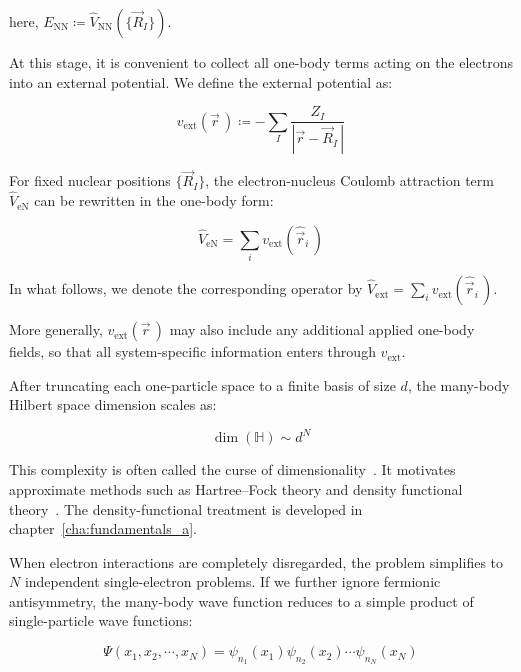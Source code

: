 here, $E_\mathrm{NN}\coloneqq \hat{V}_\mathrm{NN}(\{\vec{R}_I\})$.

At this stage, it is convenient to collect all one-body terms acting on the electrons into an external potential.
We define the external potential as:

\begin{equation}
    v_\mathrm{ext}(\vec{r}\,)\coloneqq -\sum_{I}\frac{Z_I}{|\vec{r}-\vec{R}_I\,|}
\label{one-body_Electron-nucleus}
\end{equation}

For fixed nuclear positions $\{\vec{R}_I\}$, the electron-nucleus Coulomb attraction term $\hat{V}_\mathrm{eN}$ can be rewritten in the one-body form:

\begin{equation}
    \hat{V}_\mathrm{eN}=\sum_i v_\mathrm{ext}(\hat{\vec{r}}_i\,)
\label{Electron-nucleus_one-body_form}
\end{equation}

In what follows, we denote the corresponding operator by $\hat{V}_\mathrm{ext}=\sum_i v_\mathrm{ext}(\hat{\vec{r}}_i\,)$.

More generally, $v_\mathrm{ext}(\vec{r}\,)$ may also include any additional applied one-body fields, so that all system-specific information enters through $v_\mathrm{ext}$.

After truncating each one-particle space to a finite basis of size $d$, the many-body Hilbert space dimension scales as:

\begin{equation}
    \dim(\mathbb{H})\sim d^{N}
\label{exponential_growth}
\end{equation}

This complexity is often called the curse of dimensionality~\cite{alhambra2023quantum}.
It motivates approximate methods such as Hartree--Fock theory and density functional theory~\cite{pribram2015dft,jones2015density}.
The density-functional treatment is developed in chapter~\ref{cha:fundamentals_a}.

When electron interactions are completely disregarded, the problem simplifies to $N$ independent single-electron problems.
If we further ignore fermionic antisymmetry, the many-body wave function reduces to a simple product of single-particle wave functions:

\begin{equation}
    \Psi(x_1,x_2,\cdots,x_N)=\psi_{n_1}(x_1)\psi_{n_2}(x_2)\cdots\psi_{n_N}(x_N)
\label{independent_body_function}
\end{equation}

